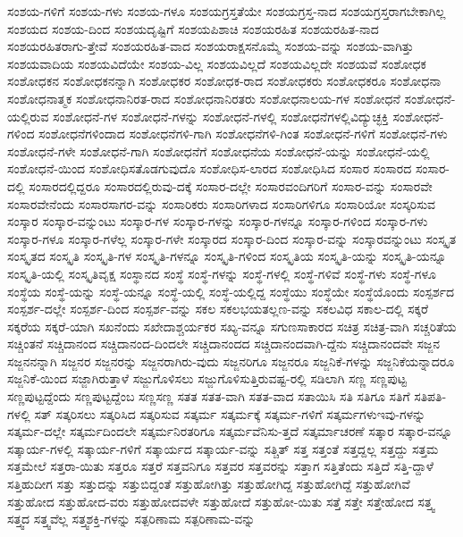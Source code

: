{ಸಂಶಯ-ಗಳಿಗೆ
ಸಂಶಯ-ಗಳು
ಸಂಶಯ-ಗಳೂ
ಸಂಶಯಗ್ರಸ್ತತೆಯೇ
ಸಂಶಯಗ್ರಸ್ತ-ನಾದ
ಸಂಶಯಗ್ರಸ್ತರಾಗಬೇಕಾಗಿಲ್ಲ
ಸಂಶಯದ
ಸಂಶಯ-ದಿಂದ
ಸಂಶಯದೃಷ್ಟಿಗೆ
ಸಂಶಯಪಿಶಾಚಿ
ಸಂಶಯರಹಿತ
ಸಂಶಯರಹಿತ-ನಾದ
ಸಂಶಯರಹಿತರಾಗು-ತ್ತೇವೆ
ಸಂಶಯರಹಿತ-ವಾದ
ಸಂಶಯರಾಕ್ಷಸನೊಮ್ಮೆ
ಸಂಶಯ-ವನ್ನು
ಸಂಶಯ-ವಾಗಿತ್ತು
ಸಂಶಯವಾದಿಯ
ಸಂಶಯವಿದೆಯೇ
ಸಂಶಯ-ವಿಲ್ಲ
ಸಂಶಯವಿಲ್ಲದೆ
ಸಂಶಯವಿಲ್ಲದೇ
ಸಂಶಯವೆ
ಸಂಶೋಧಕ
ಸಂಶೋಧಕನ
ಸಂಶೋಧಕನನ್ನಾಗಿ
ಸಂಶೋಧಕರ
ಸಂಶೋಧಕ-ರಾದ
ಸಂಶೋಧಕರು
ಸಂಶೋಧಕರೂ
ಸಂಶೋಧನಾ
ಸಂಶೋಧನಾತ್ಮಕ
ಸಂಶೋಧನಾನಿರತ-ರಾದ
ಸಂಶೋಧನಾನಿರತರು
ಸಂಶೋಧನಾಲಯ-ಗಳ
ಸಂಶೋಧನೆ
ಸಂಶೋಧನೆ-ಯಲ್ಲಿರುವ
ಸಂಶೋಧನೆ-ಗಳ
ಸಂಶೋಧನೆ-ಗಳನ್ನು
ಸಂಶೋಧನೆ-ಗಳಲ್ಲಿ
ಸಂಶೋಧನೆಗಳಲ್ಲಿವಿದ್ಯುಚ್ಛಕ್ತಿ
ಸಂಶೋಧನೆ-ಗಳಿಂದ
ಸಂಶೋಧನೆಗಳಿಂದಾದ
ಸಂಶೋಧನೆಗಳಿ-ಗಾಗಿ
ಸಂಶೋಧನೆಗಳಿ-ಗಿಂತ
ಸಂಶೋಧನೆ-ಗಳಿಗೆ
ಸಂಶೋಧನೆ-ಗಳು
ಸಂಶೋಧನೆ-ಗಳೇ
ಸಂಶೋಧನೆ-ಗಾಗಿ
ಸಂಶೋಧನೆಗೆ
ಸಂಶೋಧನೆಯ
ಸಂಶೋಧನೆ-ಯನ್ನು
ಸಂಶೋಧನೆ-ಯಲ್ಲಿ
ಸಂಶೋಧನೆ-ಯಿಂದ
ಸಂಶೋಧಿಸತೊಡಗುವುದೊ
ಸಂಶೋಧಿಸ-ಲಾರದ
ಸಂಶೋಧಿಸಿದ
ಸಂಸಾರ
ಸಂಸಾರದ
ಸಂಸಾರ-ದಲ್ಲಿ
ಸಂಸಾರದಲ್ಲಿದ್ದರೂ
ಸಂಸಾರದಲ್ಲಿರುವು-ದಕ್ಕೆ
ಸಂಸಾರ-ದಲ್ಲೇ
ಸಂಸಾರವಂದಿಗರಿಗೆ
ಸಂಸಾರ-ವನ್ನು
ಸಂಸಾರವೇ
ಸಂಸಾರವೇನೆಂದು
ಸಂಸಾರಸಾಗರ-ವನ್ನು
ಸಂಸಾರಿಕರು
ಸಂಸಾರಿಗಳಾದ
ಸಂಸಾರಿಗಳಿಗೂ
ಸಂಸಾರಿಯೋ
ಸಂಸ್ಕರಿಸುವ
ಸಂಸ್ಕಾರ
ಸಂಸ್ಕಾರ-ವನ್ನುಂಟು
ಸಂಸ್ಕಾರ-ಗಳ
ಸಂಸ್ಕಾರ-ಗಳನ್ನು
ಸಂಸ್ಕಾರ-ಗಳನ್ನೂ
ಸಂಸ್ಕಾರ-ಗಳಿಂದ
ಸಂಸ್ಕಾರ-ಗಳು
ಸಂಸ್ಕಾರ-ಗಳೂ
ಸಂಸ್ಕಾರ-ಗಳೆಲ್ಲ
ಸಂಸ್ಕಾರ-ಗಳೇ
ಸಂಸ್ಕಾರದ
ಸಂಸ್ಕಾರ-ದಿಂದ
ಸಂಸ್ಕಾರ-ವನ್ನು
ಸಂಸ್ಕಾರವನ್ನುಂಟು
ಸಂಸ್ಕೃತ
ಸಂಸ್ಕೃತದ
ಸಂಸ್ಕೃತಿ
ಸಂಸ್ಕೃತಿ-ಗಳ
ಸಂಸ್ಕೃತಿ-ಗಳನ್ನೂ
ಸಂಸ್ಕೃತಿ-ಗಳಿಂದ
ಸಂಸ್ಕೃತಿಯ
ಸಂಸ್ಕೃತಿ-ಯನ್ನು
ಸಂಸ್ಕೃತಿ-ಯನ್ನೂ
ಸಂಸ್ಕೃತಿ-ಯಲ್ಲಿ
ಸಂಸ್ಕೃತಿವೃಕ್ಷ
ಸಂಸ್ಥಾನದ
ಸಂಸ್ಥೆ
ಸಂಸ್ಥೆ-ಗಳನ್ನು
ಸಂಸ್ಥೆ-ಗಳಲ್ಲಿ
ಸಂಸ್ಥೆ-ಗಳಿವೆ
ಸಂಸ್ಥೆ-ಗಳು
ಸಂಸ್ಥೆ-ಗಳೂ
ಸಂಸ್ಥೆಯ
ಸಂಸ್ಥೆ-ಯನ್ನು
ಸಂಸ್ಥೆ-ಯನ್ನೂ
ಸಂಸ್ಥೆ-ಯಲ್ಲಿ
ಸಂಸ್ಥೆ-ಯಲ್ಲಿದ್ದ
ಸಂಸ್ಥೆಯು
ಸಂಸ್ಥೆಯೇ
ಸಂಸ್ಥೆಯೊಂದು
ಸಂಸ್ಪರ್ಶದ
ಸಂಸ್ಪರ್ಶ-ದಲ್ಲೇ
ಸಂಸ್ಪರ್ಶ-ದಿಂದ
ಸಂಸ್ಪರ್ಶ-ವನ್ನು
ಸಕಲ
ಸಕಲಭಯತಲ್ಲಣ-ವನ್ನು
ಸಕಲವಿಧ
ಸಕಾಲ-ದಲ್ಲಿ
ಸಕ್ಕರೆ
ಸಕ್ಕರೆಯ
ಸಕ್ಕರೆ-ಯಾಗಿ
ಸಖನೆಂದು
ಸಖೇದಾಶ್ಚರ್ಯಕರ
ಸಖ್ಯ-ವನ್ನೂ
ಸಗುಣಸಾಕಾರದ
ಸಚಿತ್ರ
ಸಚಿತ್ರ-ವಾಗಿ
ಸಚ್ಚರಿತೆಯ
ಸಚ್ಚಿಂತನೆ
ಸಚ್ಚಿದಾನಂದ
ಸಚ್ಚಿದಾನಂದ-ದಿಂದಲೇ
ಸಚ್ಚಿದಾನಂದದ
ಸಚ್ಚಿದಾನಂದವಾಗಿ-ದ್ದೆನು
ಸಚ್ಚಿದಾನಂದವೇ
ಸಜ್ಜನ
ಸಜ್ಜನನನ್ನಾಗಿ
ಸಜ್ಜನರ
ಸಜ್ಜನರನ್ನು
ಸಜ್ಜನರಾಗಿರು-ವುದು
ಸಜ್ಜನರಿಗೂ
ಸಜ್ಜನರೂ
ಸಜ್ಜನಿಕೆ-ಗಳನ್ನು
ಸಜ್ಜನಿಕೆಯನ್ನಾದರೂ
ಸಜ್ಜನಿಕೆ-ಯಿಂದ
ಸಜ್ಜಾಗಿರುತ್ತಾಳೆ
ಸಜ್ಜುಗೊಳಿಸಲು
ಸಜ್ಜುಗೊಳಿಸುತ್ತಿರುವಷ್ಟ-ರಲ್ಲಿ
ಸಡಿಲಾಗಿ
ಸಣ್ಣ
ಸಣ್ಣಪುಟ್ಟ
ಸಣ್ಣಪುಟ್ಟದ್ದೆಂದು
ಸಣ್ಣಪುಟ್ಟದ್ದೆಂಬ
ಸಣ್ಣಸಣ್ಣ
ಸತತ
ಸತತ-ವಾಗಿ
ಸತತ-ವಾದ
ಸತಾಯಿಸಿ
ಸತಿ
ಸತಿಗೂ
ಸತಿಗೆ
ಸತಿಪತಿ-ಗಳಲ್ಲಿ
ಸತ್
ಸತ್ಕರಿಸಲು
ಸತ್ಕರಿಸಿದ
ಸತ್ಕರಿಸುವ
ಸತ್ಕರ್ಮ
ಸತ್ಕರ್ಮಕ್ಕೆ
ಸತ್ಕರ್ಮ-ಗಳಿಗೆ
ಸತ್ಕರ್ಮಗಳುಇವು-ಗಳನ್ನು
ಸತ್ಕರ್ಮ-ದಲ್ಲೇ
ಸತ್ಕರ್ಮದಿಂದಲೇ
ಸತ್ಕರ್ಮನಿರತರಿಗೂ
ಸತ್ಕರ್ಮವೆನಿಸು-ತ್ತದೆ
ಸತ್ಕರ್ಮಾಚರಣೆ
ಸತ್ಕಾರ
ಸತ್ಕಾರ-ವನ್ನೂ
ಸತ್ಕಾರ್ಯ-ಗಳಲ್ಲಿ
ಸತ್ಕಾರ್ಯ-ಗಳಿಗೆ
ಸತ್ಕಾರ್ಯದ
ಸತ್ಕಾರ್ಯ-ವನ್ನು
ಸತ್ಚಿತ್
ಸತ್ತ
ಸತ್ತಂತೆ
ಸತ್ತದ್ದಲ್ಲ
ಸತ್ತದ್ದು
ಸತ್ತಮ
ಸತ್ತಮೇಲೆ
ಸತ್ತರಾ-ಯಿತು
ಸತ್ತರೂ
ಸತ್ತರೆ
ಸತ್ತವನಿಗೂ
ಸತ್ತವರ
ಸತ್ತವರನ್ನು
ಸತ್ತಾಗ
ಸತ್ತಿತೆಂದು
ಸತ್ತಿದೆ
ಸತ್ತಿ-ದ್ದಾಳೆ
ಸತ್ತಿಹುದೀಗ
ಸತ್ತು
ಸತ್ತುದನ್ನು
ಸತ್ತುಬಿದ್ದಂತೆ
ಸತ್ತುಹೋಗಿತ್ತು
ಸತ್ತುಹೋಗಿದ್ದ
ಸತ್ತುಹೋಗಿದ್ದೆ
ಸತ್ತುಹೋಗಿವೆ
ಸತ್ತುಹೋದ
ಸತ್ತುಹೋದ-ವರು
ಸತ್ತುಹೋದವಳೇ
ಸತ್ತುಹೋದೆ
ಸತ್ತುಹೋ-ಯಿತು
ಸತ್ತೆ
ಸತ್ತೇ
ಸತ್ತೇಹೋದ
ಸತ್ತ್ವ
ಸತ್ತ್ವದ
ಸತ್ತ್ವವೆಲ್ಲ
ಸತ್ತ್ವಶಕ್ತಿ-ಗಳನ್ನು
ಸತ್ಪರಿಣಾಮ
ಸತ್ಪರಿಣಾಮ-ವನ್ನು
}
